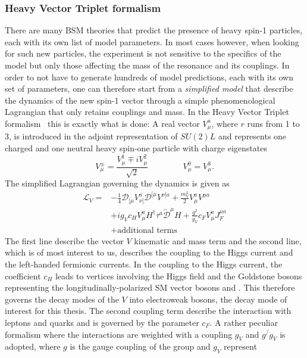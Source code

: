 \subsubsection{Heavy Vector Triplet formalism}
\label{sec:theory:hvt}
There are many BSM theories that predict the presence of heavy spin-1 particles, each with its own list of model parameters. In most cases however, when looking for such new particles, the experiment is not sensitive to the specifics of the model but only those affecting the mass of the resonance and its couplings. In order to not have to generate hundreds of model predictions, each with its own set of parameters, one can therefore start from a \emph{simplified model} that describe the dynamics of the new spin-1 vector through a simple phenomenological Lagrangian that only retains couplings and mass. In the Heavy Vector Triplet formalism~\cite{Pappadopulo:2014qza} this is exactly what is done: A real vector $V_{\mu}^a$, where $r$ runs from 1 to 3, is introduced in the adjoint representation of $SU(2)L$ and represents one charged
and one neutral heavy spin-one particle with charge eigenstates
\begin{equation}\label{eqn:HVT_1}
V^\pm_\mu = \frac{V^1_\mu \mp iV^2_\mu}{\sqrt{2}} \, \qquad\qquad V^0_\mu = V^3_\mu.
\end{equation}
The simplified Lagrangian governing the dynamics is given as
\begin{equation}
\begin{split}
\mathcal{L}_V = & -\frac{1}{4}\mathcal{D}_{[\mu}V^a_{\nu]}\mathcal{D}^{[\mu}V^{\nu]a} + \frac{m^2_V}{2}V^a_\mu V^{\mu a}\\
 & + ig_Vc_HV^a_\mu H^\dag\tau^a\overleftrightarrow{\mathcal{D}}^\mu H + \frac{g^2}{g_V}c_FV^a_\mu J^{\mu a}_F\\
 & + \mbox{additional terms}
 \end{split}
\end{equation}
The first line describe the vector $V$ kinematic and mass term and the second line, which is of most interest to us, describes the coupling to the Higgs current and the left-handed fermionic currents.
In the coupling to the Higgs current, the coefficient $c_H$ leads to vertices involving the Higgs field and the Goldstone bosons representing the longitudinally-polarized SM vector bosons \PW and \PZ.
This therefore governs the decay modes of the $V$ into electroweak bosons, the decay mode of interest for this thesis. The second coupling term describe the interaction with leptons and quarks and is governed by the parameter $c_F$. A rather peculiar formalism where the interactions are weighted with a coupling $g_V$ and $g^/g_V$ is adopted, where $g$ is the gauge coupling of the group and $g_V$ represent
